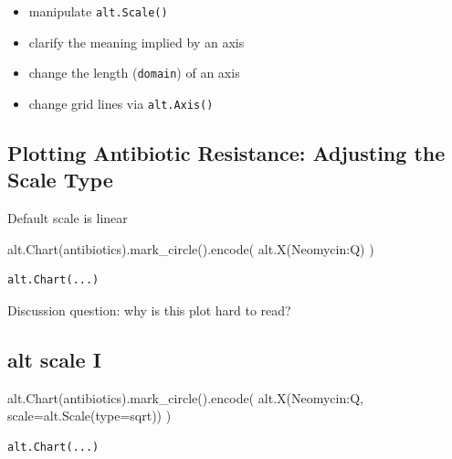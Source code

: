\documentclass[
  letterpaper,
  DIV=11,
  numbers=noendperiod]{scrartcl}
\newenvironment{Shaded}{\begin{snugshade}}{\end{snugshade}}
\newcommand{\BuiltInTok}[1]{\textcolor[rgb]{0.00,0.23,0.31}{#1}}
\newcommand{\NormalTok}[1]{\textcolor[rgb]{0.00,0.23,0.31}{#1}}
\newcommand{\OperatorTok}[1]{\textcolor[rgb]{0.37,0.37,0.37}{#1}}
\newcommand{\StringTok}[1]{\textcolor[rgb]{0.13,0.47,0.30}{#1}}
\providecommand{\tightlist}{%
  \setlength{\itemsep}{0pt}\setlength{\parskip}{0pt}}\usepackage{longtable,booktabs,array}
\begin{document}
\begin{itemize}
\tightlist
\item
  manipulate \texttt{alt.Scale()}
\item
  clarify the meaning implied by an axis
\item
  change the length (\texttt{domain}) of an axis
\item
  change grid lines via \texttt{alt.Axis()}
\end{itemize}

\subsection{Plotting Antibiotic Resistance: Adjusting the Scale
Type}\label{plotting-antibiotic-resistance-adjusting-the-scale-type}

Default scale is linear

\begin{Shaded}
\begin{Highlighting}[]
\NormalTok{alt.Chart(antibiotics).mark\_circle().encode(}
\NormalTok{    alt.X(}\StringTok{\textquotesingle{}Neomycin:Q\textquotesingle{}}\NormalTok{)}
\NormalTok{)}
\end{Highlighting}
\end{Shaded}

\begin{verbatim}
alt.Chart(...)
\end{verbatim}

Discussion question: why is this plot hard to read?

\subsection{alt scale I}\label{alt-scale-i}

\begin{Shaded}
\begin{Highlighting}[]
\NormalTok{alt.Chart(antibiotics).mark\_circle().encode(}
\NormalTok{    alt.X(}\StringTok{\textquotesingle{}Neomycin:Q\textquotesingle{}}\NormalTok{,}
\NormalTok{          scale}\OperatorTok{=}\NormalTok{alt.Scale(}\BuiltInTok{type}\OperatorTok{=}\StringTok{\textquotesingle{}sqrt\textquotesingle{}}\NormalTok{))}
\NormalTok{)}
\end{Highlighting}
\end{Shaded}

\begin{verbatim}
alt.Chart(...)
\end{verbatim}
\end{document}

